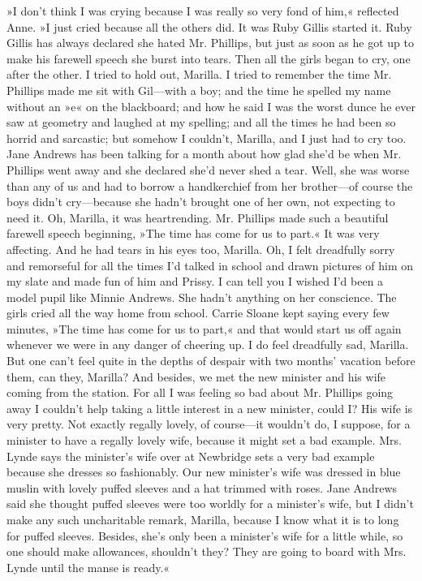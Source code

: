 »I don’t think I was crying because I was really so very fond of him,« reflected Anne. »I just cried because all the others did. It was Ruby Gillis started it. Ruby Gillis has always declared she hated Mr. Phillips, but just as soon as he got up to make his farewell speech she burst into tears. Then all the girls began to cry, one after the other. I tried to hold out, Marilla. I tried to remember the time Mr. Phillips made me sit with Gil—with a boy; and the time he spelled my name without an »e« on the blackboard; and how he said I was the worst dunce he ever saw at geometry and laughed at my spelling; and all the times he had been so horrid and sarcastic; but somehow I couldn’t, Marilla, and I just had to cry too. Jane Andrews has been talking for a month about how glad she’d be when Mr. Phillips went away and she declared she’d never shed a tear. Well, she was worse than any of us and had to borrow a handkerchief from her brother—of course the boys didn’t cry—because she hadn’t brought one of her own, not expecting to need it. Oh, Marilla, it was heartrending. Mr. Phillips made such a beautiful farewell speech beginning, »The time has come for us to part.« It was very affecting. And he had tears in his eyes too, Marilla. Oh, I felt dreadfully sorry and remorseful for all the times I’d talked in school and drawn pictures of him on my slate and made fun of him and Prissy. I can tell you I wished I’d been a model pupil like Minnie Andrews. She hadn’t anything on her conscience. The girls cried all the way home from school. Carrie Sloane kept saying every few minutes, »The time has come for us to part,« and that would start us off again whenever we were in any danger of cheering up. I do feel dreadfully sad, Marilla. But one can’t feel quite in the depths of despair with two months’ vacation before them, can they, Marilla? And besides, we met the new minister and his wife coming from the station. For all I was feeling so bad about Mr. Phillips going away I couldn’t help taking a little interest in a new minister, could I? His wife is very pretty. Not exactly regally lovely, of course—it wouldn’t do, I suppose, for a minister to have a regally lovely wife, because it might set a bad example. Mrs. Lynde says the minister’s wife over at Newbridge sets a very bad example because she dresses so fashionably. Our new minister’s wife was dressed in blue muslin with lovely puffed sleeves and a hat trimmed with roses. Jane Andrews said she thought puffed sleeves were too worldly for a minister’s wife, but I didn’t make any such uncharitable remark, Marilla, because I know what it is to long for puffed sleeves. Besides, she’s only been a minister’s wife for a little while, so one should make allowances, shouldn’t they? They are going to board with Mrs. Lynde until the manse is ready.«

